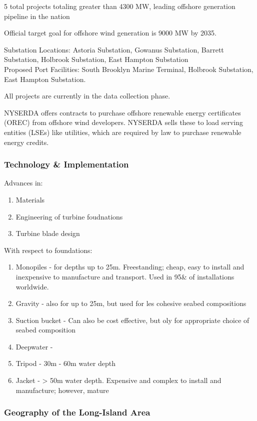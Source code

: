 \documentclass[plain]{article}
\newcommand{\1}{\mathbbm{1}}
\begin{document}
5 total projects totaling greater than 4300 MW, leading offshore generation pipeline in the nation

Official target goal for offshore wind generation is 9000 MW by 2035. \cite{NYSERDA_new_nodate-1}

Substation Locations: Astoria Substation, Gowanus Substation, Barrett Substation, Holbrook Substation, East Hampton Substation\\
Proposed Port Facilities: South Brooklyn Marine Terminal, Holbrook Substation, East Hampton Substation. \cite{NYSERDA_new_nodate-1}

All projects are currently in the data collection phase. \cite{NYSERDA_new_nodate-1}

NYSERDA offers contracts to purchase offshore renewable energy certificates (OREC) from offshore wind developers. NYSERDA sells these to load serving entities (LSEs) like utilities, which are required by law to purchase renewable energy credits. \cite{NYSERDA_new_nodate-1}

\subsubsection{Technology \& Implementation}
Advances in:
\begin{enumerate}
	\item Materials
	\item Engineering of turbine foudnations
	\item Turbine blade design
\end{enumerate}

With respect to foundations: \cite{mitchell_review_2022}
\begin{enumerate}
	\item Monopiles - for depths up to 25m. Freestanding; cheap, easy to install and inexpensive to manufacture and transport. Used in 95\& of installations worldwide.
	\item Gravity - also for up to 25m, but used for les cohesive seabed compositions
	\item Suction bucket - Can also be cost effective, but oly for appropriate choice of seabed composition
	\item Deepwater - 
	\item Tripod - 30m - 60m water depth
	\item Jacket - > 50m water depth. Expensive and complex to install and manufacture; however, mature
\end{enumerate}
\subsubsection{Geography of the Long-Island Area}
\end{document}
